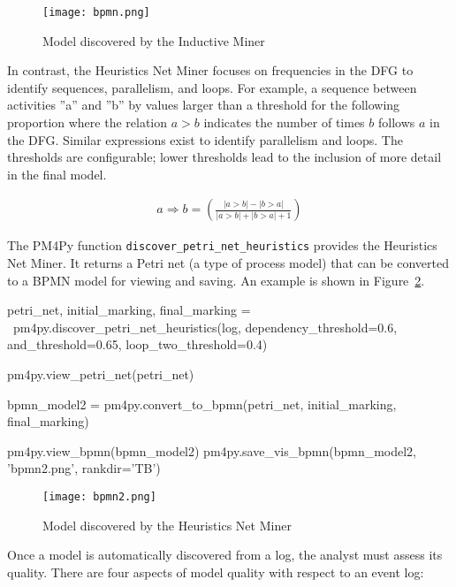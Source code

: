 \begin{figure}
\centering
\texttt{[image: bpmn.png]}
\caption{Model discovered by the Inductive Miner}
\label{fig:inductive_example}
\end{figure}

In contrast, the Heuristics Net Miner  focuses on frequencies in the DFG to identify sequences, parallelism, and loops. For example, a sequence between activities ''a'' and ''b'' by values larger than a threshold for the following proportion where the relation $a > b$ indicates the number of times $b$ follows $a$ in the DFG. Similar expressions exist to identify parallelism and loops. The thresholds are configurable; lower thresholds lead to the inclusion of more detail in the final model.

\begin{align*}
a \Rightarrow b = \left( \frac{
| a > b| - |b > a|}{
| a > b| + |b > a| + 1}\right)
\end{align*}
 
The PM4Py function \texttt{discover\_petri\_net\_heuristics} provides the Heuristics Net Miner. It returns a Petri net (a type of process model) that can be converted to a BPMN model for viewing and saving. An example is shown in Figure~\ref{fig:heuristics_example}.

\begin{samepage}
\begin{pythoncode}
petri_net, initial_marking, final_marking = \
    pm4py.discover_petri_net_heuristics(log, 
        dependency_threshold=0.6,
        and_threshold=0.65,
        loop_two_threshold=0.4)
        
pm4py.view_petri_net(petri_net)
        
bpmn_model2 = pm4py.convert_to_bpmn(petri_net, 
    initial_marking, final_marking)
    
pm4py.view_bpmn(bpmn_model2)
pm4py.save_vis_bpmn(bpmn_model2, 'bpmn2.png', rankdir='TB')
\end{pythoncode}
\end{samepage}

\begin{figure}
\centering
\texttt{[image: bpmn2.png]}
\caption{Model discovered by the Heuristics Net Miner}
\label{fig:heuristics_example}
\end{figure}

Once a model is automatically discovered from a log, the analyst must assess its quality. There are four aspects of model quality with respect to an event log:

